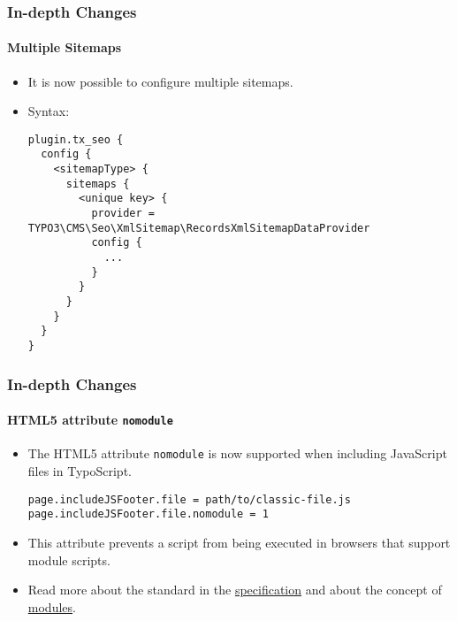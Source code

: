 
\begin{frame}[fragile]
	\frametitle{In-depth Changes}
	\framesubtitle{Multiple Sitemaps}

	\lstset{basicstyle=\tiny\ttfamily}

	\begin{itemize}

		\item It is now possible to configure multiple sitemaps.
		\item Syntax:
\begin{lstlisting}
plugin.tx_seo {
  config {
    <sitemapType> {
      sitemaps {
        <unique key> {
          provider = TYPO3\CMS\Seo\XmlSitemap\RecordsXmlSitemapDataProvider
          config {
            ...
          }
        }
      }
    }
  }
}
\end{lstlisting}

	\end{itemize}

\end{frame}


\begin{frame}[fragile]
	\frametitle{In-depth Changes}
	\framesubtitle{HTML5 attribute \texttt{nomodule}}

	\lstset{basicstyle=\tiny\ttfamily}

	\begin{itemize}
		\item The HTML5 attribute \texttt{nomodule} is now supported when including JavaScript files in TypoScript.
\begin{lstlisting}
page.includeJSFooter.file = path/to/classic-file.js
page.includeJSFooter.file.nomodule = 1
\end{lstlisting}

		\item This attribute prevents a script from being executed in browsers that support module scripts.

		\item Read more about the standard in the
			\href{https://html.spec.whatwg.org/multipage/scripting.html#attr-script-nomodule}{specification}
			and about the concept of
			\href{https://hacks.mozilla.org/2015/08/es6-in-depth-modules/}{modules}.

	\end{itemize}


\end{frame}

